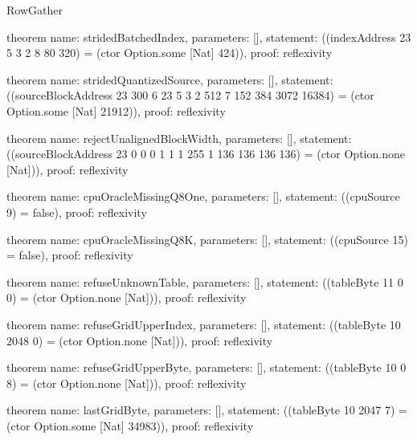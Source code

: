 \begin{lexlean}{RowGather}
\begin{semanticmodule}
theorem{
  name: stridedBatchedIndex,
  parameters: [],
  statement: ((indexAddress 23 5 3 2 8 80 320) = (ctor Option.some [Nat] 424)),
  proof: reflexivity{}
}

theorem{
  name: stridedQuantizedSource,
  parameters: [],
  statement: ((sourceBlockAddress 23 300 6 23 5 3 2 512 7 152 384 3072 16384) = (ctor Option.some [Nat] 21912)),
  proof: reflexivity{}
}

theorem{
  name: rejectUnalignedBlockWidth,
  parameters: [],
  statement: ((sourceBlockAddress 23 0 0 0 1 1 1 255 1 136 136 136 136) = (ctor Option.none [Nat])),
  proof: reflexivity{}
}

theorem{
  name: cpuOracleMissingQ8One,
  parameters: [],
  statement: ((cpuSource 9) = false),
  proof: reflexivity{}
}

theorem{
  name: cpuOracleMissingQ8K,
  parameters: [],
  statement: ((cpuSource 15) = false),
  proof: reflexivity{}
}

theorem{
  name: refuseUnknownTable,
  parameters: [],
  statement: ((tableByte 11 0 0) = (ctor Option.none [Nat])),
  proof: reflexivity{}
}

theorem{
  name: refuseGridUpperIndex,
  parameters: [],
  statement: ((tableByte 10 2048 0) = (ctor Option.none [Nat])),
  proof: reflexivity{}
}

theorem{
  name: refuseGridUpperByte,
  parameters: [],
  statement: ((tableByte 10 0 8) = (ctor Option.none [Nat])),
  proof: reflexivity{}
}

theorem{
  name: lastGridByte,
  parameters: [],
  statement: ((tableByte 10 2047 7) = (ctor Option.some [Nat] 34983)),
  proof: reflexivity{}
}
\end{semanticmodule}
\end{lexlean}
